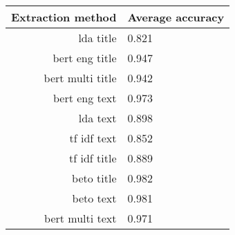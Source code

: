 \begin{tabular}{|r|l|}
  \hline
  Extraction method & Average accuracy \\ 
  \hline
  lda title & 0.821 \\ 
  \hline
  bert eng title & 0.947 \\ 
  \hline
  bert multi title & 0.942 \\ 
  \hline
  bert eng text & 0.973 \\ 
  \hline
  lda text & 0.898 \\ 
  \hline
  tf idf text & 0.852 \\ 
  \hline
  tf idf title & 0.889 \\ 
  \hline
  beto title & 0.982 \\ 
  \hline
  beto text & 0.981 \\ 
  \hline
  bert multi text & 0.971 \\ 
  \hline
\end{tabular}
